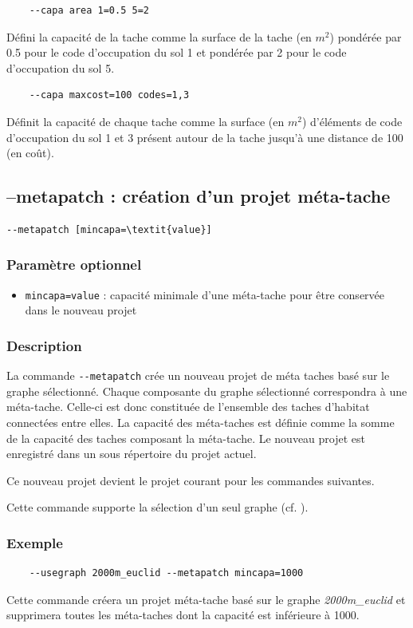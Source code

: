 \documentclass[a4paper,10pt]{report}
\begin{document}
\begin{Verbatim}
	--capa area 1=0.5 5=2
\end{Verbatim}
Défini la capacité de la tache comme la surface de la tache (en $m^2$) pondérée par 0.5 pour le code d'occupation du sol 1 et pondérée par 2 pour le code d'occupation du sol 5.

\begin{Verbatim}
	--capa maxcost=100 codes=1,3
\end{Verbatim}
Définit la capacité de chaque tache comme la surface (en $m^2$) d'éléments de code d'occupation du sol 1 et 3 présent autour de la tache jusqu'à une distance de 100 (en coût). 


\subsection{--metapatch : création d'un projet méta-tache}
\begin{Verbatim}[commandchars=\\\{\}]
--metapatch [mincapa=\textit{value}]
\end{Verbatim}

\subsubsection{Paramètre optionnel}
\begin{itemize}
	\item \verb|mincapa=value| : capacité minimale d'une méta-tache pour être conservée dans le nouveau projet
\end{itemize}

\subsubsection{Description}
La commande \verb|--metapatch| crée un nouveau projet de méta taches basé sur le graphe sélectionné. 
Chaque composante du graphe sélectionné correspondra à une méta-tache. Celle-ci est donc constituée de l’ensemble des taches d’habitat connectées entre elles.
La capacité des méta-taches est définie comme la somme de la capacité des taches composant la méta-tache. Le nouveau projet est enregistré dans un sous répertoire du projet actuel.

Ce nouveau projet devient le projet courant pour les commandes suivantes.

Cette commande supporte la sélection d'un seul graphe (cf. ).

\subsubsection{Exemple}
\begin{Verbatim}
	--usegraph 2000m_euclid --metapatch mincapa=1000
\end{Verbatim}
Cette commande créera un projet méta-tache basé sur le graphe \textit{2000m\_euclid} et supprimera toutes les méta-taches dont la capacité est inférieure à 1000.
\end{document}
